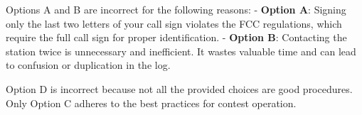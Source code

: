 Options A and B are incorrect for the following reasons:
- \textbf{Option A}: Signing only the last two letters of your call sign violates the FCC regulations, which require the full call sign for proper identification.
- \textbf{Option B}: Contacting the station twice is unnecessary and inefficient. It wastes valuable time and can lead to confusion or duplication in the log.

Option D is incorrect because not all the provided choices are good procedures. Only Option C adheres to the best practices for contest operation.

